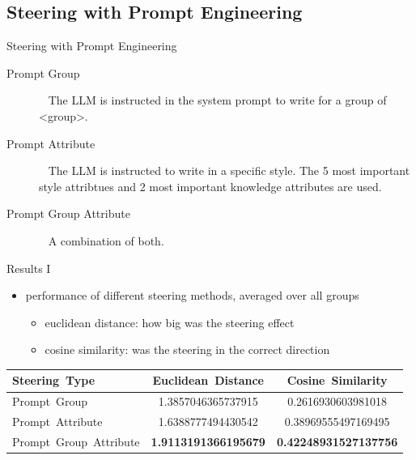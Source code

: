 \documentclass[]{beamer}
\begin{document}
\subsection{Steering with Prompt Engineering}
\begin{frame}{Steering with Prompt Engineering}
  \begin{description}
    \item[Prompt Group] ~\linebreak
          The LLM is instructed in the system prompt to write for a group of <group>.
    \item[Prompt Attribute] ~\linebreak
          The LLM is instructed to write in a specific style. The 5 most important style attribtues and 2 most important knowledge attributes are used.
    \item[Prompt Group Attribute] ~\linebreak
          A combination of both.
  \end{description}
\end{frame}

\begin{frame}{Results I}
  \begin{itemize}
    \item performance of different steering methods, averaged over all groups
          \begin{itemize}
            \item euclidean distance: how big was the steering effect
            \item cosine similarity: was the steering in the correct direction
          \end{itemize}
  \end{itemize}
  \begin{tabular}{lSS}
    \toprule
    {Steering\ Type}         & {Euclidean\ Distance}                              & {Cosine\ Similarity}                                \\
    \midrule
    Prompt\ Group            & 1.3857046365737915                                 & 0.2616930603981018                                  \\
    Prompt\ Attribute        & 1.6388777494430542                                 & 0.38969555497169495                                 \\
    Prompt\ Group\ Attribute &  \bfseries 1.9113191366195679 &  \bfseries 0.42248931527137756 \\
    \bottomrule
  \end{tabular}
\end{frame}
\end{document}
